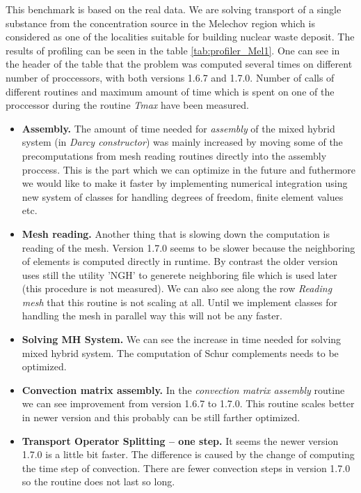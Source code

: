 This benchmark is based on the real data. We are solving transport of a single 
substance from the concentration source in the Melechov region which is considered as
one of the localities suitable for building nuclear waste deposit. The results of profiling can be seen in
the table \ref{tab:profiler_Mel1}. One can see in the header of the table that the problem was computed several times on different 
number of proccessors, with both versions 1.6.7 and 1.7.0. Number of calls of different routines and 
maximum amount of time which is spent on one of the proccessor during the routine \emph{Tmax} have been measured.


\begin{itemize}
\item \textbf{Assembly.} The amount of time needed for \emph{assembly} of the mixed hybrid system (in \emph{Darcy constructor}) 
was mainly increased by moving some of the precomputations from mesh reading routines directly into the assembly proccess. 
This is the part which we can optimize in the future and futhermore we would like to make it faster by implementing numerical 
integration using new system of classes for handling degrees of freedom, finite element values etc.

\item \textbf{Mesh reading.} Another thing that is slowing down the computation is reading of the mesh. Version 1.7.0 seems 
to be slower because the neighboring of elements is computed directly in runtime. By contrast the older version uses still 
the utility 'NGH' to generete neighboring file which is used later (this procedure is not measured). We can also see along the 
row \emph{Reading mesh} that this routine is not scaling at all. Until we implement classes for handling the mesh in parallel 
way this will not be any faster.

\item \textbf{Solving MH System.} We can see the increase in time needed for solving mixed hybrid system. The computation 
of Schur complements needs to be optimized.

\item \textbf{Convection matrix assembly.}
In the \emph{convection matrix assembly} routine we can see improvement from version 1.6.7 to 1.7.0. This routine scales better in
newer version and this probably can be still farther optimized.

\item \textbf{Transport Operator Splitting -- one step.}
It seems the newer version 1.7.0 is a little bit faster. The difference is caused by the change of computing the time step of convection. 
There are fewer convection steps in version 1.7.0 so the routine does not last so long.


\end{itemize}
